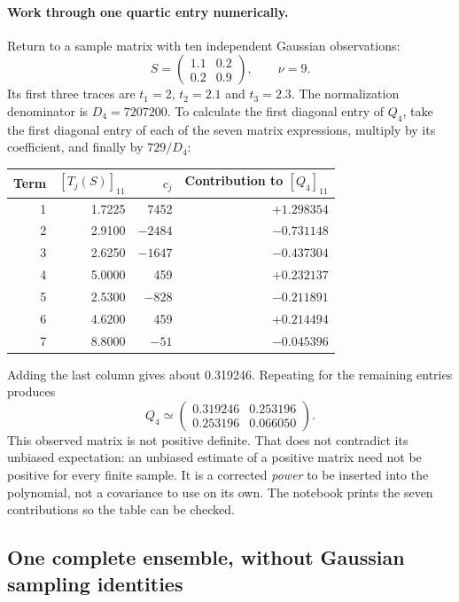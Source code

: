 \documentclass[11pt]{article}
\begin{document}
\paragraph{Work through one quartic entry numerically.}
Return to a sample matrix with ten independent Gaussian observations:
\begin{equation}
 S=\begin{pmatrix}1.1&0.2\\0.2&0.9\end{pmatrix},\qquad \nu=9.
\end{equation}
Its first three traces are $t_1=2$, $t_2=2.1$ and $t_3=2.3$.
The normalization denominator is $D_4=7207200$. To calculate the first
diagonal entry of $Q_4$, take the first diagonal entry of each of the seven
matrix expressions, multiply by its coefficient, and finally by $729/D_4$:
\begin{center}
\begin{tabular}{rrrr}
\toprule
Term & $[T_j(S)]_{11}$ & $c_j$ & Contribution to $[Q_4]_{11}$\\
\midrule
1 & 1.7225 & 7452 & $+1.298354$\\
2 & 2.9100 & $-2484$ & $-0.731148$\\
3 & 2.6250 & $-1647$ & $-0.437304$\\
4 & 5.0000 & 459 & $+0.232137$\\
5 & 2.5300 & $-828$ & $-0.211891$\\
6 & 4.6200 & 459 & $+0.214494$\\
7 & 8.8000 & $-51$ & $-0.045396$\\
\bottomrule
\end{tabular}
\end{center}
Adding the last column gives about 0.319246. Repeating for the remaining
entries produces
\begin{equation}
 Q_4\simeq\begin{pmatrix}
 0.319246&0.253196\\0.253196&0.066050
 \end{pmatrix}.
\end{equation}
This observed matrix is not positive definite. That does not contradict
its unbiased expectation: an unbiased estimate of a positive matrix need
not be positive for every finite sample. It is a corrected \emph{power}
to be inserted into the polynomial, not a covariance to use on its own.
The notebook prints the seven contributions so the table can be checked.

\subsection{One complete ensemble, without Gaussian sampling identities}
\label{sec:distinct-pair}
\end{document}

